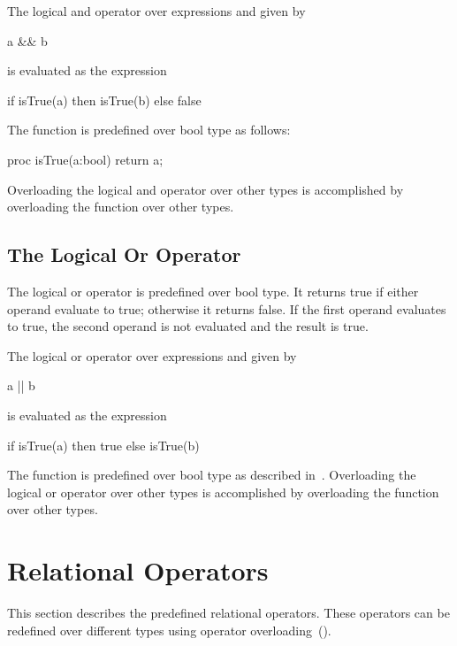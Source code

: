 The logical and operator over expressions  and  given
by
\begin{chapel}
a && b
\end{chapel}
is evaluated as the expression
\begin{chapel}
if isTrue(a) then isTrue(b) else false
\end{chapel}

The function  is predefined over bool type as follows:
\begin{chapel}
proc isTrue(a:bool) return a;
\end{chapel}
Overloading the logical and operator over other types is accomplished
by overloading the  function over other types.

\subsection{The Logical Or Operator}
\label{Logical_Or_Operators}


The logical or operator is predefined over bool type.  It returns
true if either operand evaluate to true; otherwise it returns false.
If the first operand evaluates to true, the second operand is not
evaluated and the result is true.

The logical or operator over expressions  and  given
by
\begin{chapel}
a || b
\end{chapel}
is evaluated as the expression
\begin{chapel}
if isTrue(a) then true else isTrue(b)
\end{chapel}

The function  is predefined over bool type as described
in~.  Overloading the logical or operator
over other types is accomplished by overloading the 
function over other types.

\pagebreak
\section{Relational Operators}
\label{Relational_Operators}

This section describes the predefined relational operators.  These
operators can be redefined over different types using operator
overloading~().

